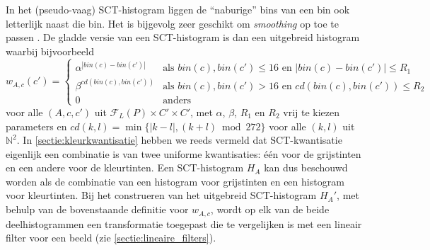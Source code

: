 In het (pseudo-vaag) SCT-histogram liggen de ``naburige'' bins van een bin ook letterlijk naast
die bin. Het is bijgevolg zeer geschikt om
\emph{smoothing} op toe te passen \cite{sural:perceptually_smooth_histogram}. De gladde versie van
een SCT-histogram is dan een uitgebreid histogram waarbij bijvoorbeeld 
$$
w_{A,c}(c')=
\left\{ \begin{array}{ll}
\alpha^{|bin(c)-bin(c')|} & \textrm{als } bin(c), bin(c') \le 16 \textrm{ en } |bin(c)-bin(c')| \le R_1 \\
\beta^{cd(bin(c),bin(c'))} & \textrm{als } bin(c), bin(c') > 16 \textrm{ en } cd(bin(c),bin(c')) \le R_2 \\ 
0 & \textrm{anders}
\end{array} \right.
$$
voor alle $(A,c,c')$ uit $\mathcal{F}_L(P) \times C' \times C'$, met
$\alpha$, $\beta$, $R_1$ en $R_2$ vrij te kiezen parameters en 
$
cd(k,l) = \min\{|k-l|, (k+l) \bmod 272\}
$ 
voor alle $(k,l)$ uit $\mathbb{N}^2$. In \ref{sectie:kleurkwantisatie} hebben 
we reeds vermeld dat SCT-kwantisatie eigenlijk een combinatie is van twee 
uniforme kwantisaties: \'e\'en voor de grijstinten en een andere voor de 
kleurtinten. Een SCT-histogram $H_A$ kan dus beschouwd 
worden als de combinatie van een histogram voor grijstinten en een histogram 
voor kleurtinten. 
Bij het construeren van het uitgebreid SCT-histogram $H_A'$, met behulp van de bovenstaande 
definitie voor $w_{A,c}$, wordt op elk van de beide deelhistogrammen een 
transformatie toegepast die te vergelijken is met een lineair filter voor 
een beeld (zie \ref{sectie:lineaire_filters}). 


